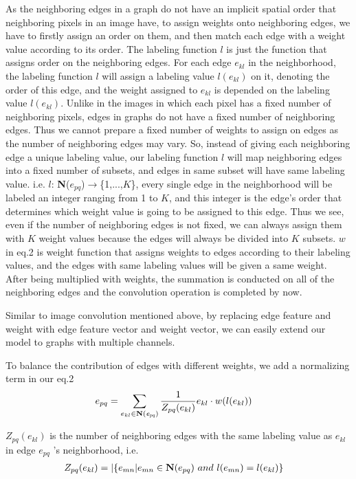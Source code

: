 \documentclass[a4paper,11pt]{article}
\begin{document}
As the neighboring edges in a graph do not have an implicit spatial order that neighboring pixels in an image have, to assign weights onto neighboring edges, we have to firstly assign an order on them, and then match each edge with a weight value according to its order. The labeling function $l$ is just the function that assigns order on the neighboring edges. For each edge $e_{kl}$ in the neighborhood, the labeling function $l$ will assign a labeling value $l(e_{kl})$ on it, denoting the order of this edge, and the weight assigned to $e_{kl}$ is depended on the labeling value $l(e_{kl})$. Unlike in the images in which each pixel has a fixed number of neighboring pixels, edges in graphs do not have a fixed number of neighboring edges. Thus we cannot prepare a fixed number of weights to assign on edges as the number of neighboring edges may vary. So, instead of giving each neighboring edge a unique labeling value, our labeling function $l$ will map neighboring edges into a fixed number of subsets, and edges in same subset will have same labeling value. i.e. $l$: {\bf N}($e_{pq}$)$\to$\{1,...,$K$\}, every single edge in the neighborhood will be labeled an integer ranging from 1 to $K$, and this integer is the edge's order that determines which weight value is going to be assigned to this edge. Thus we see, even if the number of neighboring edges is not fixed, we can always assign them with $K$ weight values because the edges will always be divided into $K$ subsets. $w$ in eq.2 is weight function that assigns weights to edges according to their labeling values, and the edges with same labeling values will be given a same weight. After being multiplied with weights, the summation is conducted on all of the neighboring edges and the convolution operation is completed by now.

Similar to image convolution mentioned above, by replacing edge feature and weight with edge feature vector and weight vector, we can easily extend our model to graphs with multiple channels.




To balance the contribution of edges with different weights, we add a normalizing term in our eq.2
\begin{align}
&e_{pq} = \sum_{e_{kl} \in {\bf N({\it e_{pq}})}} \frac{1}{Z_{pq}(e_{kl})} e_{kl} \cdot w(l(e_{kl})) &
\end{align}

{${Z_{pq}(e_{kl})}$} is the number of neighboring edges with the same labeling value as $e_{kl}$ in edge $e_{pq}$ 's neighborhood, i.e. 
\begin{align}
&Z_{pq}(e_{kl}) = |  \{e_{mn}|e_{mn} \in{\bf N}(e_{pq}) \  and \  l(e_{mn})=l(e_{kl})\}  &
\end{align}
\end{document}
